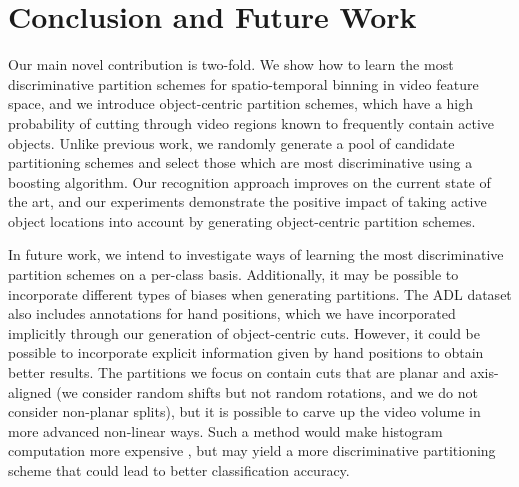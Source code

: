 \documentclass{bmvc2k}
\begin{document}
\section{Conclusion and Future Work}
	Our main novel contribution is two-fold. We show how to learn the most
  discriminative partition schemes for spatio-temporal binning in video feature space, and
  we introduce object-centric partition schemes, which have a high
  probability of cutting through video regions known to frequently contain
  active objects. Unlike previous work, we randomly generate a pool of
  candidate partitioning schemes and select those which are most
  discriminative using a boosting algorithm.
  Our recognition approach improves on the current state of the art, and our
  experiments demonstrate the positive impact of taking active object
  locations into account by generating object-centric partition schemes.
  
  In future work, we intend to investigate ways of learning the most
  discriminative partition schemes on a per-class basis.
	Additionally, it may be possible to incorporate different types of biases when generating
	partitions. The ADL dataset also includes annotations for hand positions,
	which we have incorporated implicitly through our generation of
  object-centric cuts.
	However,
	it could be possible to incorporate explicit information given by hand
	positions to obtain better results.
	The partitions we focus on contain cuts that are
  planar and axis-aligned (we consider random shifts but not random
  rotations, and we do not consider non-planar splits),
  but it is possible to carve up the
	video volume in more advanced non-linear ways. Such a method would 
  make histogram computation more expensive	, but may yield a more discriminative
	partitioning scheme that could lead to better classification accuracy.

\end{document}
